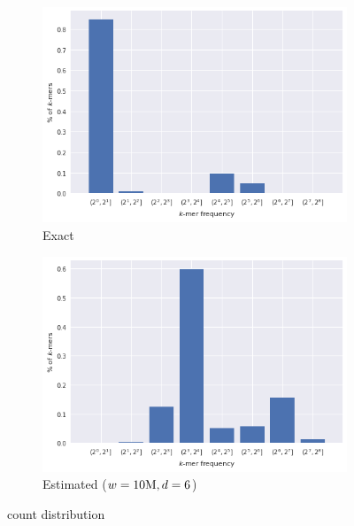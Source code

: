 \begin{figure}[htb]
    \centering
    \begin{subfigure}{.5\textwidth}
        \centering
        \includegraphics[width=\textwidth]{figures/e_coli-kmer_frequencies-exact-K31}
        \caption{Exact}\label{fig:ecoli-art-dbcm-counts-exact}
    \end{subfigure}%
    \begin{subfigure}{.5\textwidth}
        \centering
        \includegraphics[width=\textwidth]{figures/e_coli-kmer_frequencies-estimated-K31-W10000000-D6}
        \caption{Estimated ($w = 10\mega, d = 6$)}\label{fig:ecoli-art-dbcm-counts-exact}
    \end{subfigure}
	\caption{\kmer count distribution}\label{fig:ecoli-art-dbcm-counts}
\end{figure}

